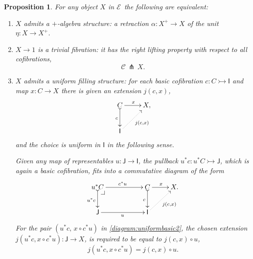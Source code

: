 \documentclass[11pt,reqno]{amsart}
\makeatletter
\newcommand{\EE}{\ensuremath{\mathcal{E}}}
\newcommand{\rep}[1]{\ensuremath{\mathsf{#1}}}%
\newcommand{\mono}{\ensuremath{\rightarrowtail}}
\newcommand{\ra}{\ensuremath{\rightarrow}}
\renewcommand{\to}{\ensuremath{\rightarrow}}
\newtheorem{proposition}[theorem]{Proposition}
\theoremstyle{remark}
\theoremstyle{definition}
\newcommand{\pbcorner}[1][dr]{\save*!/#1-1.2pc/#1:(-1,1)@^{|-}\restore}
\makeatother
\begin{document}
\begin{proposition}\label{prop:uniformstructequiv} For any object $X$ in \EE\ the following are equivalent:
\begin{enumerate}
\item $X$ admits a \emph{$+$-algebra structure:} a retraction $\alpha :X^+\ra X$ of the unit $\eta : X\ra X^+$.
\item $X\to 1$ is a \emph{trivial fibration:} it has the right lifting property with respect to all cofibrations,
\[
\mathcal{C}\, \pitchfork\,X.
\]
\item\label{smalluniformfilling} $X$ admits a \emph{uniform filling structure:} 
for each basic cofibration $c : C \mono \rep{I}$ and map $x : C\ra X$ there is given an extension $j(c,x)$,
\begin{equation}\label{diagram:uniformbasic}
\xymatrix{
C \ar@{>->}[d]_{c} \ar[r]^{x} & X, \\
\rep{I}\ar@{.>}[ru]_{j(c,x)} &
}
\end{equation}
and the choice is \emph{uniform in $\rep{I}$} in the following sense.  

Given any map of representables $u : \rep{J} \ra \rep{I}$, the pullback $u^*c : u^*C\mono \rep{J}$, which is again a basic cofibration, fits into a commutative diagram of the form
\begin{equation}\label{diagram:uniformbasic2}
\xymatrix{
u^*C \ar@{>->}[d]_{u^*c} \ar[rr]^{c^*u} \pbcorner &&  C \ar@{>->}[d]_{c} \ar[r]^{x} & X. \\
\rep{J} \ar[rr]_{u} && \rep{I} \ar@{.>}[ru]_{j(c,x)} &
}
\end{equation}
For the pair $(u^*c,\, x\circ c^*u)$ in \eqref{diagram:uniformbasic2}, the chosen extension $j(u^*c,x\circ c^*u): \rep{J} \ra X$, is required to be equal to  $j(c,x)\circ u$,
\begin{equation}\label{eq:uniformfillers}
j(u^*c,x\circ c^*u) = j(c,x) \circ u.
\end{equation}
\end{enumerate}
\end{proposition}
\end{document}
